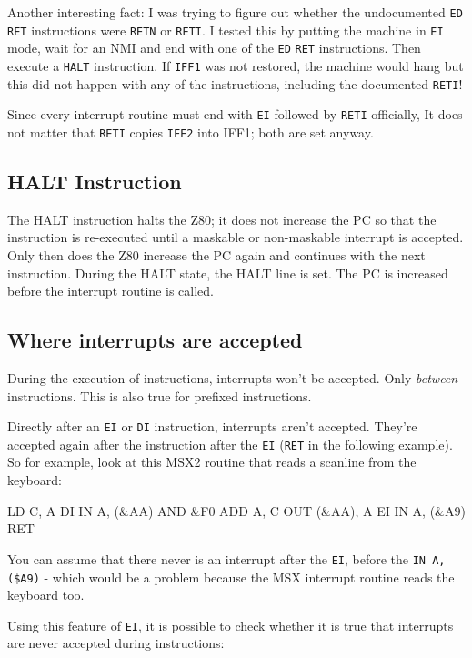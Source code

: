 Another interesting fact: I was trying to figure out whether the undocumented {\tt ED} {\tt RET} instructions were {\tt RETN} or {\tt RETI}. I tested this by putting the machine in {\tt EI} mode, wait for an NMI and end with one of the {\tt ED} {\tt RET} instructions. Then execute a {\tt HALT} instruction. If {\tt IFF1} was not restored, the machine would hang but this did not happen with any of the instructions, including the documented {\tt RETI}!

Since every interrupt routine must end with {\tt EI} followed by {\tt RETI} officially, It does not matter that {\tt RETI} copies {\tt IFF2} into IFF1; both are set anyway.


\subsection{HALT Instruction}

The HALT instruction halts the Z80; it does not increase the PC so that the instruction is re-executed until a maskable or non-maskable interrupt is accepted. Only then does the Z80 increase the PC again and continues with the next instruction. During the HALT state, the HALT line is set. The PC is increased before the interrupt routine is called.


\subsection{Where interrupts are accepted}

During the execution of instructions, interrupts won't be accepted. Only {\em between} instructions. This is also true for prefixed instructions.

Directly after an {\tt EI} or {\tt DI} instruction, interrupts aren't accepted. They're accepted again after the instruction after the {\tt EI} ({\tt RET} in the following example). So for example, look at this MSX2 routine that reads a scanline from the keyboard:

\begin{tcblisting}{}
	LD C, A
	DI
	IN A, (&AA)
	AND &F0
	ADD A, C
	OUT (&AA), A
	EI
	IN A, (&A9)
	RET
\end{tcblisting}

You can assume that there never is an interrupt after the {\tt EI}, before the {\tt IN A,(\$A9)} - which would be a problem because the MSX interrupt routine reads the keyboard too.

Using this feature of {\tt EI}, it is possible to check whether it is true that interrupts are never accepted during instructions:

